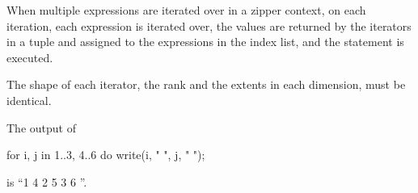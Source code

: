 When multiple expressions are iterated over in a zipper context, on
each iteration, each expression is iterated over, the values are
returned by the iterators in a tuple and assigned to the expressions
in the index list, and the statement is executed.

The shape of each iterator, the rank and the extents in each
dimension, must be identical.

\begin{example}
The output of
\begin{chapel}
for i, j in 1..3, 4..6 do
  write(i, " ", j, " ");
\end{chapel}
is ``1 4 2 5 3 6 ''.
\end{example}
